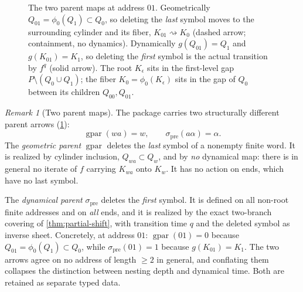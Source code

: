 \documentclass[11pt,reqno]{amsart}
\numberwithin{equation}{section}
\theoremstyle{plain}
\theoremstyle{definition}
\theoremstyle{remark}
\newtheorem{remark}[theorem]{Remark}
\DeclareMathOperator{\gpar}{gpar}
\newcommand{\spre}{\sigma_{\mathrm{pre}}}
\begin{document}
\begin{figure}[t]
\centering
{}
\caption{The two parent maps at address $01$.  Geometrically
$Q_{01}=\phi_0(Q_1)\subset Q_0$, so deleting the \emph{last} symbol
moves to the surrounding cylinder and its fiber,
$K_{01}\rightsquigarrow K_0$ (dashed arrow; containment, no dynamics).
Dynamically $g(Q_{01})=Q_1$ and $g(K_{01})=K_1$, so deleting the
\emph{first} symbol is the actual transition by $f^q$ (solid arrow).
The root $K_\epsilon$ sits in the first-level gap
$P\setminus(Q_0\cup Q_1)$; the fiber $K_0=\phi_0(K_\epsilon)$ sits in
the gap of $Q_0$ between its children $Q_{00},Q_{01}$.}
\label{fig:two-parents}
\end{figure}

\begin{remark}[Two parent maps]
\label{rem:two-parents}
The package carries two structurally different parent arrows
(\cref{fig:two-parents}):
\begin{equation}
 \gpar(wa)=w,
 \qquad
 \spre(a\alpha)=\alpha .
\label{eq:two-parents}
\end{equation}
The \emph{geometric parent} $\gpar$ deletes the \emph{last} symbol of a
nonempty finite word.  It is realized by cylinder inclusion,
$Q_{wa}\subset Q_w$, and by \emph{no} dynamical map: there is in
general no iterate of $f$ carrying $K_{wa}$ onto $K_w$.  It has no
action on ends, which have no last symbol.

The \emph{dynamical parent} $\spre$ deletes the \emph{first} symbol.
It is defined on all non-root finite addresses and on \emph{all} ends,
and it is realized by the exact two-branch covering of
\cref{thm:partial-shift}, with transition time $q$ and the deleted
symbol as inverse sheet.  Concretely, at address $01$:
$\gpar(01)=0$ because $Q_{01}=\phi_0(Q_1)\subset Q_0$, while
$\spre(01)=1$ because $g(K_{01})=K_1$.  The two arrows agree on no
address of length $\ge2$ in general, and conflating them collapses the
distinction between nesting depth and dynamical time.  Both are
retained as separate typed data.
\end{remark}
\end{document}
